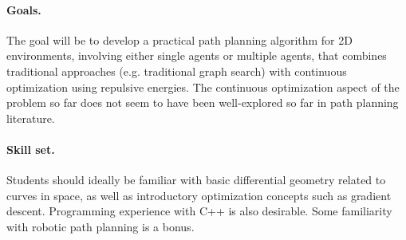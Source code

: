 \documentclass[11pt]{article}
\begin{document}
\paragraph{Goals.} The goal will be to develop a practical path planning algorithm for 2D environments, involving either single agents or multiple agents, that combines traditional approaches (e.g. traditional graph search) with continuous optimization using repulsive energies. The continuous optimization aspect of the problem so far does not seem to have been well-explored so far in path planning literature.

\paragraph{Skill set.} Students should ideally be familiar with basic differential geometry related to curves in space, as well as introductory optimization concepts such as gradient descent. Programming experience with C++ is also desirable. Some familiarity with robotic path planning is a bonus.
\end{document}
